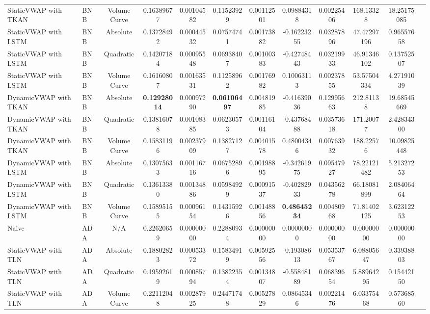 \begin{table}[H]
{\begin{tabular}{llcccccccccc}
        StaticVWAP with TKAN & BNB & Volume Curve & 0.16389677 & 0.00104582 & 0.11523929 & 0.00112501 & 0.09884318 & 0.00225406 & 168.13328 & 18.25175085 \\
        StaticVWAP with LSTM & BNB & Absolute & 0.13728492 & 0.00044532 & 0.07574741 & 0.00173882 & -0.16223255 & 0.03287896 & 47.47297196 & 0.96557658 \\
        StaticVWAP with LSTM & BNB & Quadratic & 0.14207184 & 0.00095548 & 0.06938407 & 0.00100383 & -0.42748443 & 0.03219933 & 46.91346102 & 0.13752507 \\
        StaticVWAP with LSTM & BNB & Volume Curve & 0.16160807 & 0.00163531 & 0.11258962 & 0.00176982 & 0.10063113 & 0.00237855 & 53.57504334 & 4.27191039 \\
        DynamicVWAP with TKAN & BNB & Absolute & \textbf{0.12928014} & 0.00097290 & \textbf{0.06106497} & 0.00481985 & -0.41639036 & 0.12995663 & 212.81138 & 19.68545669 \\
        DynamicVWAP with TKAN & BNB & Quadratic & 0.13816078 & 0.00108385 & 0.06230573 & 0.00116104 & -0.43768488 & 0.03573618 & 171.20077 & 2.42834300 \\
        DynamicVWAP with TKAN & BNB & Volume Curve & 0.15831196 & 0.00237909 & 0.13827127 & 0.00401578 & 0.48004346 & 0.00763932 & 188.22576 & 10.09825448 \\
        DynamicVWAP with LSTM & BNB & Absolute & 0.13075633 & 0.00116716 & 0.06752896 & 0.00198895 & -0.34261975 & 0.09547927 & 78.22121482 & 5.21327253 \\
        DynamicVWAP with LSTM & BNB & Quadratic & 0.13613380 & 0.00134886 & 0.05984929 & 0.00091537 & -0.40282933 & 0.04356278 & 66.18081899 & 2.08406464 \\
        DynamicVWAP with LSTM & BNB & Volume Curve & 0.15895155 & 0.00096154 & 0.14315926 & 0.00148856 & \textbf{0.48645234} & 0.00480968 & 71.81402125 & 3.62312253 \\
        \hline
        Naive & ADA & N/A & 0.22620659 & 0.00000000 & 0.22880934 & 0.00000000 & 0.00000000 & 0.00000000 & 0.00000000 & 0.00000000 \\
        StaticVWAP with TLN & ADA & Absolute & 0.18802823 & 0.00053372 & 0.15834919 & 0.00592556 & -0.19308613 & 0.05353767 & 6.08805647 & 0.33938803 \\
        StaticVWAP with TLN & ADA & Quadratic & 0.19592619 & 0.00085794 & 0.13822354 & 0.00134807 & -0.55848189 & 0.06839654 & 5.88964295 & 0.15442150 \\
        StaticVWAP with TLN & ADA & Volume Curve & 0.22112048 & 0.00287925 & 0.24471748 & 0.00527829 & 0.08645346 & 0.00221476 & 6.03375468 & 0.57368560 \\

\end{tabular}}
\end{table}
